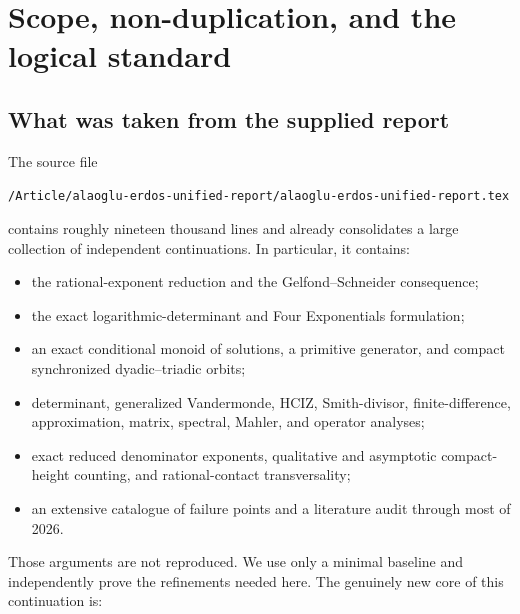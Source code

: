 \documentclass[11pt]{article}
\theoremstyle{definition}
\theoremstyle{remark}
\begin{document}
\tableofcontents
\newpage

\section{Scope, non-duplication, and the logical standard}

\subsection{What was taken from the supplied report}

The source file
\begin{center}
\texttt{/Article/alaoglu-erdos-unified-report/alaoglu-erdos-unified-report.tex}
\end{center}
contains roughly nineteen thousand lines and already consolidates a large collection of
independent continuations.  In particular, it contains:

\begin{itemize}[leftmargin=2em]
\item the rational-exponent reduction and the Gelfond--Schneider consequence;
\item the exact logarithmic-determinant and Four Exponentials formulation;
\item an exact conditional monoid of solutions, a primitive generator, and compact
      synchronized dyadic--triadic orbits;
\item determinant, generalized Vandermonde, HCIZ, Smith-divisor, finite-difference,
      approximation, matrix, spectral, Mahler, and operator analyses;
\item exact reduced denominator exponents, qualitative and asymptotic compact-height
      counting, and rational-contact transversality;
\item an extensive catalogue of failure points and a literature audit through most of 2026.
\end{itemize}

Those arguments are not reproduced.  We use only a minimal baseline and independently prove
the refinements needed here.  The genuinely new core of this continuation is:
\end{document}
